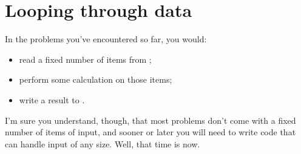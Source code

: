 
\chapter{Looping through data}

In the problems you've encountered so far, you would:
\begin{itemize}
  \item read a fixed number of items from \IN;
  \item perform some calculation on those items;
  \item write a result to \OUT.
\end{itemize}

I'm sure you understand, though, that most problems don't come with a fixed number of
items of input, and sooner or later you will need to write code that can handle input of
any size. Well, that time is now.

